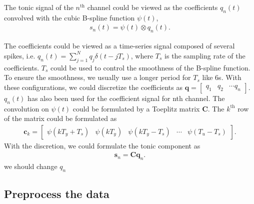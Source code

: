 \documentclass[]{article}
\begin{document}
The tonic signal of the $n^{\mathrm{th}}$ channel could be viewed as the coefficients $q_n (t)$ convolved with the cubic B-spline function $\psi(t)$,
\begin{align}
  s_n(t) =  \psi(t) \otimes q_n (t).
\end{align}

The coefficients could be viewed as a time-series signal composed of several spikes, i.e. $q_n (t) = \sum_{j=1}^N q_j \delta(t - jT_s)$, where $T_s$ is the sampling rate of the coefficients. $T_s$ could be used to control the smoothness of the B-spline function. To ensure the smoothness, we usually use a longer period for $T_s$ like 6s. With these configurations, we could discretize the coefficients as $\mathbf{q} = \begin{bmatrix}
  q_1 & q_2 & \cdots q_n
\end{bmatrix}$.
{\color{red}   $q_n(t)$ has also been used for the coefficient signal for nth channel.}
The convolution on $\psi(t)$ could be formulated by a Toeplitz matrix $\mathbf{C}$. The $k^{\mathrm{th}}$ row of the matrix could be formulated as
\begin{align}
  \mathbf{c}_k = \begin{bmatrix}
    \psi(kT_y + T_s) & \psi(kT_y) & \psi(kT_y - T_s) & \cdots & \psi(T_u - T_s)
  \end{bmatrix}.
\end{align}
With the discretion, we could formulate the tonic component as
\begin{align}
  \mathbf{s}_n = \mathbf{C} \mathbf{q}_n.
\end{align}
{\color{red} we should change $q_n$}

\subsection{Preprocess the data}
\end{document}
